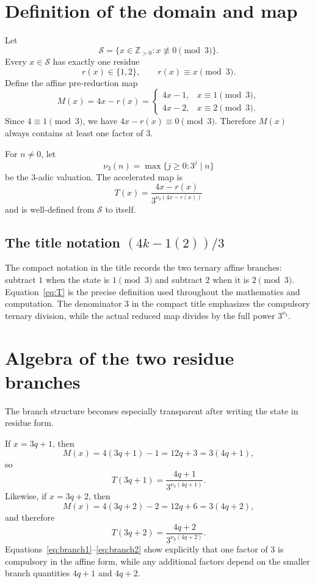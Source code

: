 \documentclass[11pt]{article}
\newcommand{\vthree}{\nu_3}
\newcommand{\Sset}{\mathcal S}
\newcommand{\Tmap}{T}
\newcommand{\Mmap}{M}
\begin{document}
\section{Definition of the domain and map}
Let
\begin{equation}
\Sset=\{x\in\mathbb Z_{>0}:x\not\equiv0\pmod3\}.
\end{equation}
Every $x\in\Sset$ has exactly one residue
\[
r(x)\in\{1,2\},\qquad r(x)\equiv x\pmod3.
\]
Define the affine pre-reduction map
\begin{equation}
\Mmap(x)=4x-r(x)=
\begin{cases}
4x-1,&x\equiv1\pmod3,\\
4x-2,&x\equiv2\pmod3.
\end{cases}
\label{eq:M}
\end{equation}
Since $4\equiv1\pmod3$, we have $4x-r(x)\equiv0\pmod3$.  Therefore $\Mmap(x)$ always contains at least one factor of $3$.

For $n\ne0$, let
\[
\vthree(n)=\max\{j\ge0:3^j\mid n\}
\]
be the $3$-adic valuation.  The accelerated map is
\begin{equation}
\boxed{
\Tmap(x)=\frac{4x-r(x)}{3^{\vthree(4x-r(x))}}
}
\label{eq:T}
\end{equation}
and is well-defined from $\Sset$ to itself.

\subsection{The title notation $(4k-1(2))/3$}
The compact notation in the title records the two ternary affine branches: subtract $1$ when the state is $1\pmod3$ and subtract $2$ when it is $2\pmod3$.  Equation~\eqref{eq:T} is the precise definition used throughout the mathematics and computation.  The denominator $3$ in the compact title emphasizes the compulsory ternary division, while the actual reduced map divides by the full power $3^{\vthree}$.

\section{Algebra of the two residue branches}
The branch structure becomes especially transparent after writing the state in residue form.

If $x=3q+1$, then
\begin{equation}
\Mmap(x)=4(3q+1)-1=12q+3=3(4q+1),
\end{equation}
so
\begin{equation}
\Tmap(3q+1)=\frac{4q+1}{3^{\vthree(4q+1)}}.
\label{eq:branch1}
\end{equation}
Likewise, if $x=3q+2$, then
\begin{equation}
\Mmap(x)=4(3q+2)-2=12q+6=3(4q+2),
\end{equation}
and therefore
\begin{equation}
\Tmap(3q+2)=\frac{4q+2}{3^{\vthree(4q+2)}}.
\label{eq:branch2}
\end{equation}
Equations~\eqref{eq:branch1}--\eqref{eq:branch2} show explicitly that one factor of $3$ is compulsory in the affine form, while any additional factors depend on the smaller branch quantities $4q+1$ and $4q+2$.
\end{document}
